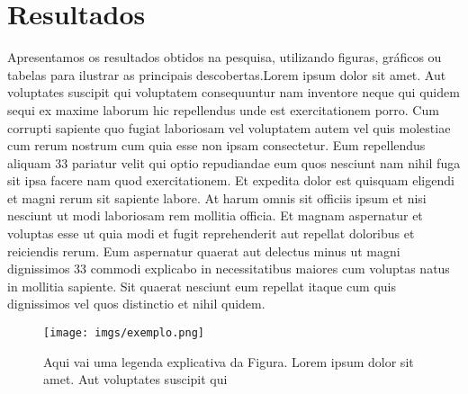\documentclass[12pt]{article}
\begin{document}
\section{Resultados} %
Apresentamos os resultados obtidos na pesquisa, utilizando figuras, gráficos ou tabelas para ilustrar as principais descobertas.Lorem ipsum dolor sit amet. Aut voluptates suscipit qui voluptatem consequuntur nam inventore neque qui quidem sequi ex maxime laborum hic repellendus unde est exercitationem porro. Cum corrupti sapiente quo fugiat laboriosam vel voluptatem autem vel quis molestiae cum rerum nostrum cum quia esse non ipsam consectetur. Eum repellendus aliquam 33 pariatur velit qui optio repudiandae eum quos nesciunt nam nihil fuga sit ipsa facere nam quod exercitationem. Et expedita dolor est quisquam eligendi et magni rerum sit sapiente labore. At harum omnis sit officiis ipsum et nisi nesciunt ut modi laboriosam rem mollitia officia. Et magnam aspernatur et voluptas esse ut quia modi et fugit reprehenderit aut repellat doloribus et reiciendis rerum. Eum aspernatur quaerat aut delectus minus ut magni dignissimos 33 commodi explicabo in necessitatibus maiores cum voluptas natus in mollitia sapiente. Sit quaerat nesciunt eum repellat itaque cum quis dignissimos vel quos distinctio et nihil quidem.

\begin{figure}[H] %
  \centering
  \texttt{[image: imgs/exemplo.png]}
  \caption{Aqui vai uma legenda explicativa da Figura. Lorem ipsum dolor sit amet. Aut voluptates suscipit qui } %
  \label{fig:exemplo} %
\end{figure}
\end{document}
